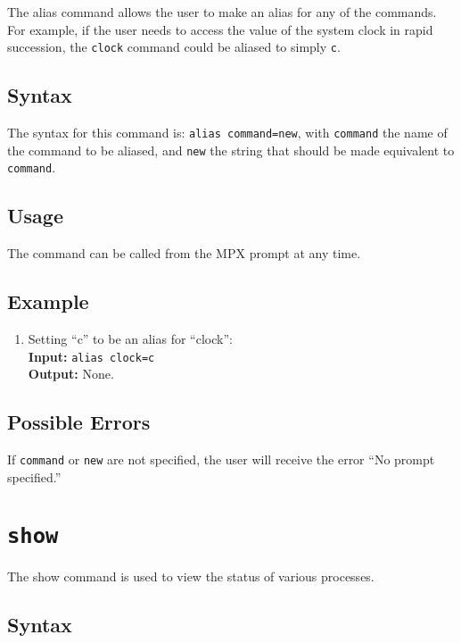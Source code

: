 The alias command allows the user to make an alias for any of the commands. For example, 
if the user needs to access the value of the system clock in rapid succession, the
{\tt clock} command could be aliased to simply {\tt c}.

\subsection{Syntax}

The syntax for this command is: {\tt alias command=new}, with {\tt command} the name of
the command to be aliased, and {\tt new} the string that should be made equivalent to
{\tt command}.

\subsection{Usage}

The command can be called from the MPX prompt at any time.

\subsection{Example}
\begin{enumerate}
    \item Setting ``c'' to be an alias for ``clock'': \\
        {\bf Input:} {\tt alias clock=c} \\
        {\bf Output:} None.
\end{enumerate}
\subsection{Possible Errors}

If {\tt command} or {\tt new} are not specified, the user will receive the error ``No
prompt specified.''








\section{\tt show}
\label{show_cmd}

The show command is used to view the status of various processes.

\subsection{Syntax}

